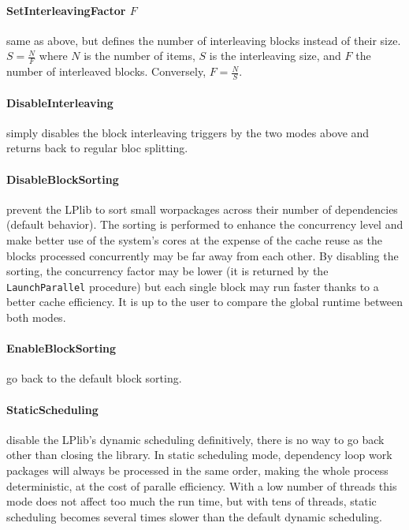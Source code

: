 \documentclass[a4paper,12pt]{article}
\begin{document}
\paragraph{SetInterleavingFactor $F$} same as above, but defines the number of interleaving blocks instead of their size. $S = \frac{N}{F}$ where $N$ is the number of items, $S$ is the interleaving size, and $F$ the number of interleaved blocks. Conversely, $F = \frac{N}{S}$.

\paragraph{DisableInterleaving} simply disables the block interleaving triggers by the two modes above and returns back to regular bloc splitting.

\paragraph{DisableBlockSorting} prevent the LPlib to sort small worpackages across their number of dependencies (default behavior). The sorting is performed to enhance the concurrency level and make better use of the system's cores at the expense of the cache reuse as the blocks processed concurrently may be far away from each other. By disabling the sorting, the concurrency factor may be lower (it is returned by the {\tt LaunchParallel} procedure) but each single block may run faster thanks to a better cache efficiency. It is up to the user to compare the global runtime between both modes.

\paragraph{EnableBlockSorting} go back to the default block sorting.

\paragraph{StaticScheduling} disable the LPlib's dynamic scheduling definitively, there is no way to go back other than closing the library. In static scheduling mode, dependency loop work packages will always be processed in the same order, making the whole process deterministic, at the cost of paralle efficiency. With a low number of threads this mode does not affect too much the run time, but with tens of threads, static scheduling becomes several times slower than the default dynamic scheduling.
\end{document}

